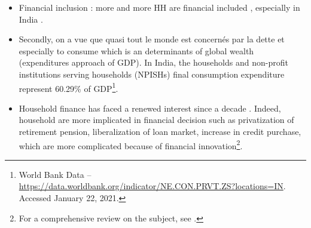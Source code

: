 \documentclass[a4paper, 11pt, onecolumn]{article}
\begin{document}
\begin{itemize}
\item Financial inclusion : more and more HH are financial included \citep{Badarinza2019}, especially in India \citep{Chakravartya2013}. 
\item Secondly, on a vue que quasi tout le monde est concernés par la dette et especially to consume which is an determinants of global wealth (expenditures approach of GDP).
In India, the households and non-profit institutions serving households (NPISHs) final consumption expenditure represent 60.29\% of GDP\footnote{World Bank Data -- \url{https://data.worldbank.org/indicator/NE.CON.PRVT.ZS?locations=IN}. Accessed January 22, 2021.}.
\item Household finance has faced a renewed interest since a decade \citep{Guiso2013}.
Indeed, household are more implicated in financial decision such as privatization of retirement pension, liberalization of loan market, increase in credit purchase, which are more complicated because of financial innovation\footnote{For a comprehensive review on the subject, see \cite{Tufano2003}.}.
\end{itemize}





\end{document}
